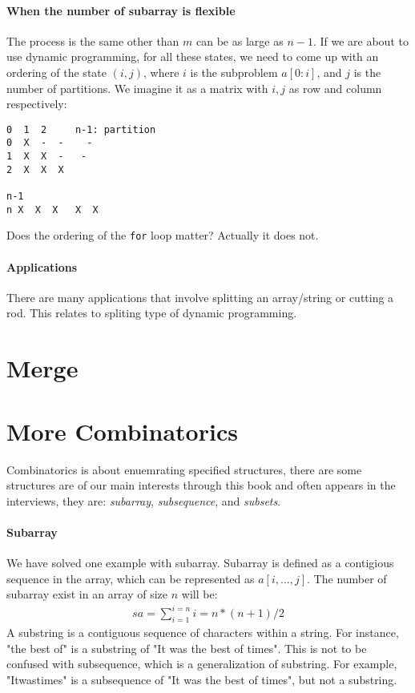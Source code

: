 \documentclass[../main.tex]{subfiles}
\begin{document}
\paragraph{When the number of subarray is flexible} The process is the same other than $m$ can be as large as $n-1$. If we are about to use dynamic programming, for all these states, we need to come up with an ordering of the state $(i, j)$, where $i$ is the subproblem $a[0:i]$, and $j$ is the number of partitions. We imagine it as a matrix with $i, j$ as row and column respectively:
\begin{lstlisting}[numbers=none]
   0  1  2     n-1: partition
0  X  -  -    - 
1  X  X  -   -
2  X  X  X 

n-1
n X  X  X   X  X 
\end{lstlisting}
Does the ordering of the \texttt{for} loop matter? Actually it does not. 

\paragraph{Applications} There are many applications that involve splitting an array/string or cutting a rod.  This relates to spliting type of dynamic programming.

\section{Merge}


\section{More Combinatorics}
Combinatorics is about enuemrating specified structures, there are some structures are of our main interests through this book and often appears in the interviews, they are: \textit{subarray}, \textit{subsequence}, and \textit{subsets}.
\paragraph{Subarray} We have solved one example with subarray. Subarray is defined as a contigious sequence in the array, which can be represented as $a[i,...,j]$. The number of subarray exist in an array of size $n$ will be:
\begin{align}
    sa=\sum_{i=1}^{i=n} i = n*(n+1)/2
\end{align}
A substring is a contiguous sequence of characters within a string. For instance, "the best of" is a substring of "It was the best of times". This is not to be confused with subsequence, which is a generalization of substring. For example, "Itwastimes" is a subsequence of "It was the best of times", but not a substring.
\end{document}
